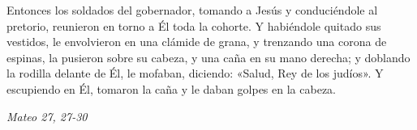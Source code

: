 \documentclass[../../devocionario.tex]{subfiles}
\begin{document}
    Entonces los soldados del gobernador, tomando a Jesús y conduciéndole al pretorio, 
    reunieron en torno a Él toda la cohorte. Y habiéndole quitado sus vestidos, le envolvieron en una clámide de grana, 
    y trenzando una corona de espinas, la pusieron sobre su cabeza, y una caña en su mano derecha; 
    y doblando la rodilla delante de Él, le mofaban, diciendo: «Salud, Rey de los judíos». 
    Y escupiendo en Él, tomaron la caña y le daban golpes en la cabeza.

    \begin{flushright}
        \textit{Mateo 27, 27-30}
    \end{flushright}
\end{document}
